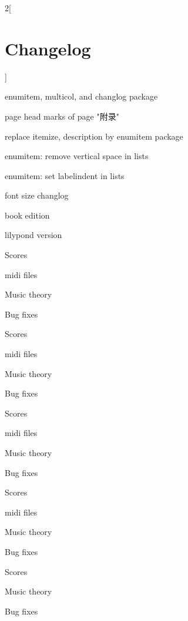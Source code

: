 {\begin{multicols*}{2}[\section*{Changelog}]
\begin{changelog}[author=李小丹, section=false]
\begin{version}[v=3.0-$\beta$(3.1415), date=2023-12-22]
		\item enumitem, multicol, and changlog package
	\fixed
		\item page head marks of page "附录"
	\changed
		\item replace itemize, description by enumitem package
		\item enumitem: remove vertical space in lists
		\item enumitem: set labelindent in lists
		\item font size changlog
		\item book edition
		\item lilypond version
\end{version}
\begin{version}[v=2.9-$\beta$(3.141), date=2023-04-28]
	\added
		\item Scores
		\item midi files
		\item Music theory
	\fixed
		\item Bug fixes
\end{version}
\begin{version}[v=2.8-$\beta$(3.141), date=2023-04-24]
	\added
		\item Scores
		\item midi files
		\item Music theory
	\fixed
		\item Bug fixes
\end{version}
\begin{version}[v=2.7-$\beta$(3.141), date=2023-04-22]
	\added
		\item Scores
		\item midi files
		\item Music theory
	\fixed
		\item Bug fixes
\end{version}
\begin{version}[v=2.6-$\beta$(3.141), date=2023-04-15]
	\added
		\item Scores
		\item midi files
		\item Music theory
	\fixed
		\item Bug fixes
\end{version}
\begin{version}[v=2.5-$\beta$(3.141), date=2023-04-08]
	\added
		\item Scores
		\item Music theory
	\fixed
		\item Bug fixes
\end{version}

\end{changelog}
\end{multicols*}}
